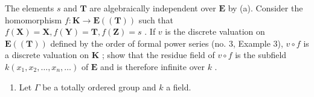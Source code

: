The elements \(s\) and \(\mathbf{T}\) are algebraically independent over \(\mathbf{E}\) by (a). Consider the homomorphism \(f\colon \mathbf{K} \to \mathbf{E}((\mathbf{T}))\) such that \(f(\mathbf{X}) = \mathbf{X}, f(\mathbf{Y}) = \mathbf{T}, f(\mathbf{Z}) = s\) . If \(v\) is the discrete valuation on \(\mathbf{E}((\mathbf{T}))\) defined by the order of formal power series (no. 3, Example 3), \(v \circ f\) is a discrete valuation on \(\mathbf{K}\) ; show that the residue field of \(v \circ f\) is the subfield \(k(x_1, x_2, \ldots, x_n, \ldots)\) of \(\mathbf{E}\) and is therefore infinite over \(k\) .

\begin{enumerate}
\def\labelenumi{\arabic{enumi}.}
\setcounter{enumi}{1}
\tightlist
\item
  Let \(\Gamma\) be a totally ordered group and \(k\) a field.
\end{enumerate}

